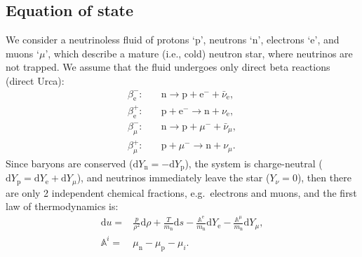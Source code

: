 \documentclass[aps,prd,twocolumn,a4paper,floatfix,nofootbib,superscriptaddress,nofootinbib]{revtex4}
\newcommand{\re}{\mathrm{e}}
\newcommand{\rn}{\mathrm{n}}
\begin{document}
\subsection{Equation of state}
\label{ssec:eos}

We consider a neutrinoless fluid of protons `p', neutrons `n', electrons `e', and muons `$\mu$',
which describe a mature (i.e., cold) neutron star, where neutrinos are not trapped.
We assume that the fluid undergoes only direct beta reactions (direct Urca):
%
\begin{align}
%
\label{eq:beta-minus-e}
\beta^-_\mathrm{e}:  {}&\quad \mathrm n \to \mathrm p + \mathrm e^- + \bar\nu_\mathrm{e},\\
%
\label{eq:beta-plus-e}
\beta^+_\mathrm{e}:  {}&\quad \mathrm p + \mathrm e^- \to \mathrm n + \nu_\mathrm{e},\\
%
\label{eq:beta-minus-mu}
\beta^-_\mu:{}&\quad \mathrm n \to \mathrm p + \mu^- + \bar\nu_\mu,\\
%
\label{eq:beta-plus-mu}
\beta^+_\mu:{}&\quad \mathrm p + \mu^- \to \mathrm n + \nu_\mu.
%
\end{align}
%
Since baryons are conserved ($\mathrm dY_\mathrm n=-\mathrm dY_\mathrm p$),
the system is charge-neutral ($\mathrm dY_\mathrm
p=\mathrm dY_\mathrm e+\mathrm dY_\mu$),
and neutrinos immediately leave the star ($Y_\nu=0$), then
there are only 2 independent chemical fractions, e.g.~electrons and muons, and
the first law of thermodynamics is:
%
\begin{align}
\label{eq:1st-law}
\mathrm du={}&\frac p{\rho^2}\mathrm d\rho + \frac T{m_\rn}\mathrm ds
- \frac{\mathbb A^\re}{m_\rn} \mathrm dY_\re
- \frac{\mathbb A^\mu}{m_\rn} \mathrm dY_\mu,\\
%
\label{eq:affinity}
\mathbb A^i={}& \mu_\mathrm{n} - \mu_\mathrm{p} - \mu_i.
\end{align}
%
\end{document}
